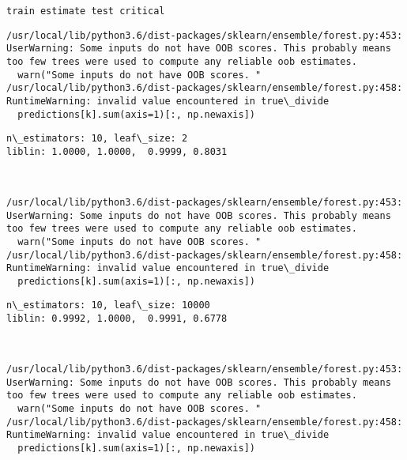 \documentclass[10pt, t]{beamer}
\begin{document}
    \begin{Verbatim}[commandchars=\\\{\}]
train estimate test critical

    \end{Verbatim}

    \begin{Verbatim}[commandchars=\\\{\}]
/usr/local/lib/python3.6/dist-packages/sklearn/ensemble/forest.py:453: UserWarning: Some inputs do not have OOB scores. This probably means too few trees were used to compute any reliable oob estimates.
  warn("Some inputs do not have OOB scores. "
/usr/local/lib/python3.6/dist-packages/sklearn/ensemble/forest.py:458: RuntimeWarning: invalid value encountered in true\_divide
  predictions[k].sum(axis=1)[:, np.newaxis])

    \end{Verbatim}

    \begin{Verbatim}[commandchars=\\\{\}]
n\_estimators: 10, leaf\_size: 2
liblin: 1.0000, 1.0000,  0.9999, 0.8031 



    \end{Verbatim}

    \begin{Verbatim}[commandchars=\\\{\}]
/usr/local/lib/python3.6/dist-packages/sklearn/ensemble/forest.py:453: UserWarning: Some inputs do not have OOB scores. This probably means too few trees were used to compute any reliable oob estimates.
  warn("Some inputs do not have OOB scores. "
/usr/local/lib/python3.6/dist-packages/sklearn/ensemble/forest.py:458: RuntimeWarning: invalid value encountered in true\_divide
  predictions[k].sum(axis=1)[:, np.newaxis])

    \end{Verbatim}

    \begin{Verbatim}[commandchars=\\\{\}]
n\_estimators: 10, leaf\_size: 10000
liblin: 0.9992, 1.0000,  0.9991, 0.6778 



    \end{Verbatim}

    \begin{Verbatim}[commandchars=\\\{\}]
/usr/local/lib/python3.6/dist-packages/sklearn/ensemble/forest.py:453: UserWarning: Some inputs do not have OOB scores. This probably means too few trees were used to compute any reliable oob estimates.
  warn("Some inputs do not have OOB scores. "
/usr/local/lib/python3.6/dist-packages/sklearn/ensemble/forest.py:458: RuntimeWarning: invalid value encountered in true\_divide
  predictions[k].sum(axis=1)[:, np.newaxis])

    \end{Verbatim}
\end{document}
